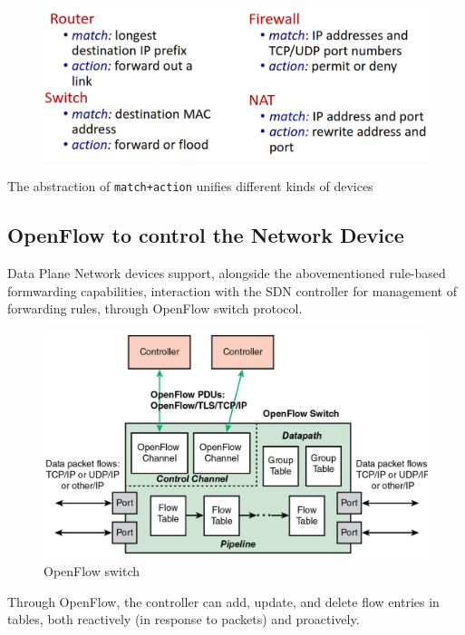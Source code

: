 
\begin{figure}[htbp]
   \centering
   \includegraphics{images/openflow_matchaction.png}
   \label{fig:openflow_matchaction}
\end{figure}
The abstraction of \texttt{match+action} unifies different kinds of devices

\subsection{OpenFlow to control the Network Device}
Data Plane Network devices support, alongside the abovementioned rule-based formwarding capabilities, interaction with the SDN controller for management of forwarding rules, through OpenFlow switch protocol.

\begin{figure}[htbp]
   \centering
   \includegraphics{images/openflow_switch.png}
   \caption{OpenFlow switch}
   \label{fig:openflow_switch}
\end{figure}
Through OpenFlow, the controller can add, update, and delete flow
entries in tables, both reactively (in response to packets) and
proactively.

